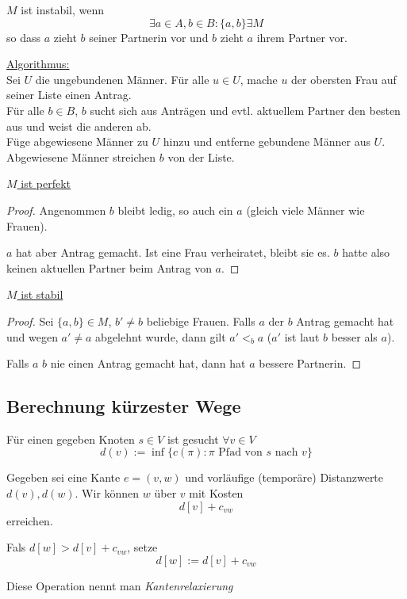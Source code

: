 \documentclass[11pt]{scrartcl}
\begin{document}
\begin{df}
$M$ ist instabil, wenn
\[
\exists a\in A, b\in B: \{a,b\} \exists M
\]
so dass $a$ zieht $b$ seiner Partnerin vor und $b$ zieht $a$ ihrem Partner vor.
\end{df}

\underline{Algorithmus:}\\
Sei $U$ die ungebundenen Männer.
Für alle $u\in U$, mache $u$ der obersten Frau auf seiner Liste einen Antrag.\\
Für alle $b\in B$, $b$ sucht sich aus Anträgen und evtl. aktuellem Partner den besten aus und weist die anderen ab.\\
Füge abgewiesene Männer zu $U$ hinzu und entferne gebundene Männer aus $U$.\\
Abgewiesene Männer streichen $b$ von der Liste.

\underline{$M$ ist perfekt}\\
\begin{proof}
	Angenommen $b$ bleibt ledig, so auch ein $a$ (gleich viele Männer wie Frauen).

$a$ hat aber Antrag gemacht.
Ist eine Frau verheiratet, bleibt sie es.
$b$ hatte also keinen aktuellen Partner beim Antrag von $a$.
\end{proof}

\underline{$M$ ist stabil}\\
\begin{proof}
Sei $\{a,b\}\in M$, $b'\neq b$ beliebige Frauen.
Falls $a$ der $b$ Antrag gemacht hat und wegen $a'\neq a$ abgelehnt wurde, dann gilt
$a'<_b a$ ($a'$ ist laut $b$ besser als $a$).

Falls $a$ $b$ nie einen Antrag gemacht hat, dann hat $a$ bessere Partnerin.
\end{proof}

\subsection{Berechnung kürzester Wege}

Für einen gegeben Knoten $s\in V$ ist gesucht $\forall v\in V$
\[
d(v) :=  \inf \{c(\pi):\pi \text{ Pfad von $s$ nach $v$}\}
\]


\begin{df}[Kantenrelaxierung]
Gegeben sei eine Kante $e=(v,w)$ und vorläufige (temporäre) Distanzwerte $d(v), d(w)$.
Wir können $w$ über $v$ mit Kosten
\[
d[v]+c_{vw}
\]
erreichen.

Fals $d[w] > d[v] + c_{vw}$, setze
\[
d[w] := d[v] + c_{vw}
\]

Diese Operation nennt man \emph{Kantenrelaxierung}
\end{df}
\end{document}
